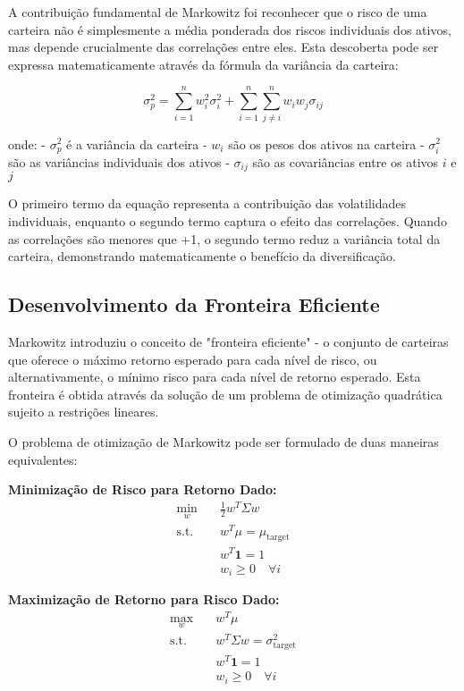 A contribuição fundamental de Markowitz foi reconhecer que o risco de uma carteira não é simplesmente a média ponderada dos riscos individuais dos ativos, mas depende crucialmente das correlações entre eles. Esta descoberta pode ser expressa matematicamente através da fórmula da variância da carteira:

\begin{equation}
\sigma_p^2 = \sum_{i=1}^{n} w_i^2 \sigma_i^2 + \sum_{i=1}^{n} \sum_{j \neq i}^{n} w_i w_j \sigma_{ij}
\end{equation}

onde:
- $\sigma_p^2$ é a variância da carteira
- $w_i$ são os pesos dos ativos na carteira
- $\sigma_i^2$ são as variâncias individuais dos ativos
- $\sigma_{ij}$ são as covariâncias entre os ativos $i$ e $j$

O primeiro termo da equação representa a contribuição das volatilidades individuais, enquanto o segundo termo captura o efeito das correlações. Quando as correlações são menores que +1, o segundo termo reduz a variância total da carteira, demonstrando matematicamente o benefício da diversificação.

\subsection{Desenvolvimento da Fronteira Eficiente}

Markowitz introduziu o conceito de "fronteira eficiente" - o conjunto de carteiras que oferece o máximo retorno esperado para cada nível de risco, ou alternativamente, o mínimo risco para cada nível de retorno esperado. Esta fronteira é obtida através da solução de um problema de otimização quadrática sujeito a restrições lineares.

O problema de otimização de Markowitz pode ser formulado de duas maneiras equivalentes:

\textbf{Minimização de Risco para Retorno Dado:}
\begin{align}
\min_w \quad & \frac{1}{2} w^T \Sigma w \\
\text{s.t.} \quad & w^T \mu = \mu_{\text{target}} \\
& w^T \mathbf{1} = 1 \\
& w_i \geq 0 \quad \forall i
\end{align}

\textbf{Maximização de Retorno para Risco Dado:}
\begin{align}
\max_w \quad & w^T \mu \\
\text{s.t.} \quad & w^T \Sigma w = \sigma_{\text{target}}^2 \\
& w^T \mathbf{1} = 1 \\
& w_i \geq 0 \quad \forall i
\end{align}

